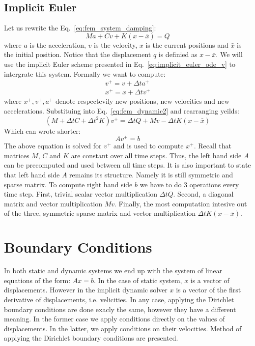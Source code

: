 \documentclass[en]{minipw} %
\begin{document}
\subsection{Implicit Euler}
\label{sec:ImplicitEuler}
Let us rewrite the Eq.~\ref{eq:fem_system_damping}:
\begin{equation}
\label{eq:fem_dynamic2}
M a + C v + K(x-\bar{x}) = Q
\end{equation}
where $a$ is the acceleration, $v$ is the velocity, $x$ is the current positions and $\bar{x}$ is the initial position. Notice that the displacement $q$ is definied as $x-\bar{x}$. We will use the implicit Euler scheme presented in Eq.~\ref{eq:implicit_euler_ode_v} to intergrate this system. Formally we want to compute:
\begin{equation}
\begin{aligned}
v^{+} = v + \Delta t a^{+}
\\
x^{+} = x + \Delta t v^{+}
\end{aligned}
\end{equation}
where $x^{+}, v^{+}, a^{+}$ denote respectevily new positions, new velocities and new accelerations. Substituing into Eq.~\ref{eq:fem_dynamic2} and rearranging yeilds:
\begin{equation}
\label{eq:fem_dynamic3}
(M + \Delta t C + \Delta t^{2} K)v^{+} = \Delta t Q + Mv - \Delta t K(x-\bar{x})
\end{equation} 
Which can wrote shorter:
\begin{equation}
\label{eq:fem_dynamic4}
Av^{+} = b
\end{equation} 
The above equation is solved for $v^{+}$ and is used to compute $x^{+}$.
Recall that matrices $M$, $C$ and $K$ are constant over all time steps. Thus, the left hand side $A$ can be precomputed and used between all time steps. It is also important to state that left hand side $A$ remains its structure. Namely it is still symmetric and sparse matrix. 
To compute right hand side $b$ we have to do 3 operations every time step. First, trivial scalar vector multiplication $\Delta t Q$. Second, a diagonal matrix and vector multiplication $Mv$. Finally, the most computation intesive out of the three, symmetric sparse matrix and vector multiplication $\Delta t K(x-\bar{x})$.

\section{Boundary Conditions}
In both static and dynamic systems we end up with the system of linear equations of the form: $Ax=b$. In the case of static system, $x$ is a vector of displacements. However in the implicit dynamic solver $x$ is a vector of the first derivative of displacements, i.e. velicities. In any case, applying the Dirichlet boundary conditions are done exacly the same, however they have a different meaning. In the former case we apply conditions directly on the values of displacements. In the latter, we apply conditions on their velocities. Method of applying the Dirichlet boundary conditions are presented.
\end{document}
